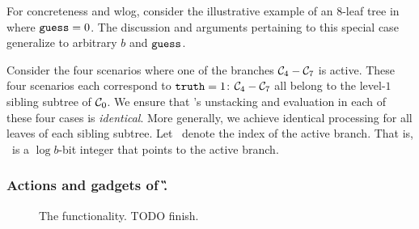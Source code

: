 For concreteness and wlog,
consider the illustrative example of an $8$-leaf tree in~ where $\mathtt{guess}=0$. 
The discussion and arguments pertaining to this special case generalize to arbitrary $b$ and $\mathtt{guess}$.

Consider the four scenarios where one of the branches $\mathcal C_4-\mathcal C_7$ is active.
These four scenarios each correspond
to $\mathtt{truth} = 1$: $\mathcal C_4-\mathcal C_7$ all belong to the level-$1$ sibling subtree of
$\mathcal C_0$.
%
We ensure that \E's unstacking and evaluation in each
of these four cases is \emph{identical}.  More generally, we achieve identical processing for all leaves of each sibling subtree.
Let \aid\ denote the index of the active branch. That is, \aid\ is a $\log
b$-bit integer that points to the active branch.


\subsubsection{Actions and gadgets of \G.}

\begin{figure}[t!]\centering{}\caption{The \gadget functionality. TODO
finish.}\label{fig:sortinghat}
\end{figure}

